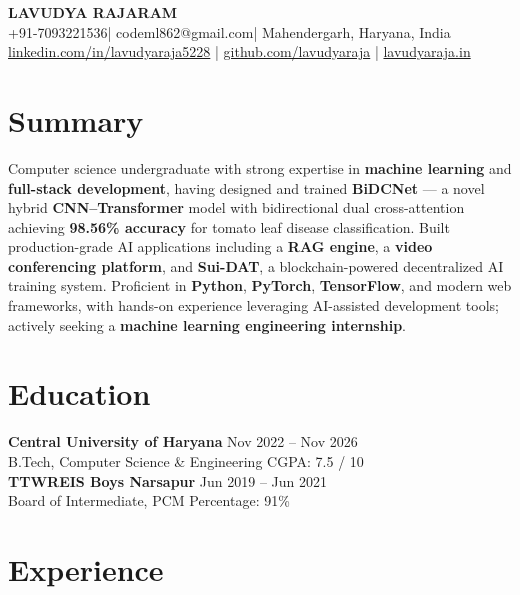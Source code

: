 \documentclass[11pt,letterpaper]{article}
\makeatletter
\newcommand{\resumename}{LAVUDYA RAJARAM}
\newcommand{\resumeemail}{codeml862@gmail.com}
\newcommand{\resumephone}{+91-7093221536}
\newcommand{\resumelocation}{Mahendergarh, Haryana, India}
\newcommand{\resumelinkedin}{linkedin.com/in/lavudyaraja5228}
\newcommand{\resumegithub}{github.com/lavudyaraja}
\newcommand{\resumeportfolio}{lavudyaraja.in}
\makeatother
\begin{document}
\begin{center}
  {\LARGE \textbf{\resumename}} \\[6pt]
  \resumephone \;|\; \resumeemail \;|\; \resumelocation \\[2pt]
  \href{https://\resumelinkedin}{\resumelinkedin} \;|\;
  \href{https://\resumegithub}{\resumegithub} \;|\;
  \href{https://\resumeportfolio}{\resumeportfolio}
\end{center}

\vspace{4pt}

\section{Summary}
Computer science undergraduate with strong expertise in \textbf{machine learning} and \textbf{full-stack development}, having designed and trained \textbf{BiDCNet} --- a novel hybrid \textbf{CNN--Transformer} model with bidirectional dual cross-attention achieving \textbf{98.56\% accuracy} for tomato leaf disease classification. Built production-grade AI applications including a \textbf{RAG engine}, a \textbf{video conferencing platform}, and \textbf{Sui-DAT}, a blockchain-powered decentralized AI training system. Proficient in \textbf{Python}, \textbf{PyTorch}, \textbf{TensorFlow}, and modern web frameworks, with hands-on experience leveraging AI-assisted development tools; actively seeking a \textbf{machine learning engineering internship}.

\section{Education}

\textbf{Central University of Haryana} \hfill Nov 2022 -- Nov 2026 \\
B.Tech, Computer Science \& Engineering \hfill CGPA: 7.5 / 10 \\[4pt]

\textbf{TTWREIS Boys Narsapur} \hfill Jun 2019 -- Jun 2021 \\
Board of Intermediate, PCM \hfill Percentage: 91\%

\section{Experience}
\end{document}
